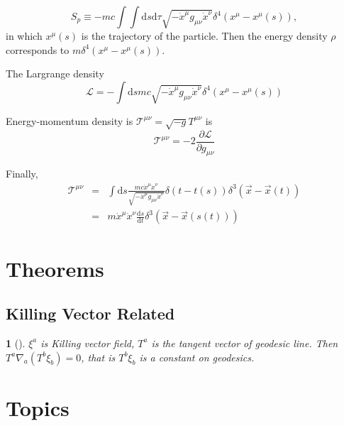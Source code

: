 \documentclass[12pt,a4paper]{book}
\begin{document}
\begin{equation}
S_p \equiv -m c \int \int \mathrm d s\mathrm d\tau \sqrt{-\dot x ^\mu g_{\mu\nu} \dot x^\nu} \delta^4(x^\mu - x^\mu (s))    ,
\end{equation}
in which $x^\mu(s)$ is the trajectory of the particle. Then the energy density $\rho$ corresponds to $m\delta^4(x^\mu- x^\mu(s))$.

The Largrange density
\begin{equation}
\mathcal L = -\int\mathrm ds mc \sqrt{-\dot x^\mu g_{\mu\nu}\dot x^\nu}\delta^4(x^\mu - x^\mu(s))
\end{equation}

Energy-momentum density is $\mathcal T^{\mu\nu} = \sqrt{-g}T^{\mu\nu}$ is
\begin{equation} 
\mathcal T^{\mu\nu} = -2 \frac{\partial \mathcal L}{\partial g_{\mu\nu}}
\end{equation}

Finally,
\begin{eqnarray}
\mathcal T^{\mu\nu} &=& \int \mathrm ds \frac{mc\dot x^\mu \dot x^\nu}{\sqrt{-\dot x^\mu g_{\mu\nu} \dot x^\nu}} \delta(t-t(s))\delta^3(\vec x - \vec x(t)) \\
&=& m\dot x^\mu \dot x^\nu \frac{\mathrm d s}{\mathrm d t} \delta^3(\vec x - \vec x(s(t)))
\end{eqnarray}






\section{Theorems}

\subsection{Killing Vector Related}

\newtheorem{theorem}{}[chapter]

\begin{theorem}[]
$\xi^a$ is Killing vector field, $T^a$ is the tangent vector of geodesic line. Then $T^a\nabla_a(T^b\xi_b)=0$, that is $T^b\xi_b$ is a constant on geodesics.
\end{theorem}






\section{Topics}
\end{document}

